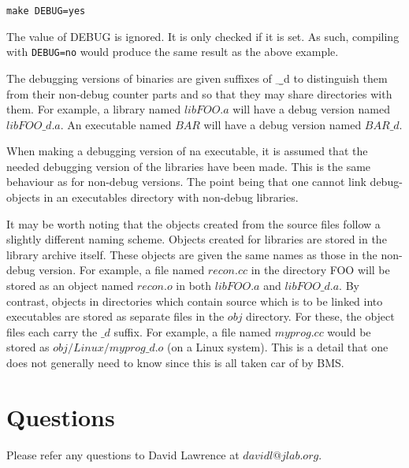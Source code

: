 \documentclass[12pt]{article}
\begin{document}
\begin{lstlisting}[frame=single,backgroundcolor=\color{cmdbkgd}]
make DEBUG=yes
\end{lstlisting}

The value of DEBUG is ignored. It is only checked if it is set. As
such, compiling with {\lstinline !DEBUG=no!} would produce the same
result as the above example.

The debugging versions of binaries are given suffixes of {\b \_d}
to distinguish them from their non-debug counter parts and so that
they may share directories with them. For example, a library named
$libFOO.a$ will have a debug version named $libFOO\_d.a$. An executable
named $BAR$ will have a debug version named $BAR\_d$.

When making a debugging version of na executable, it is assumed that
the needed debugging version of the libraries have been made.
This is the same behaviour as for non-debug versions. The point
being that one cannot link debug-objects in an executables
directory with non-debug libraries.

It may be worth noting that the objects created from the source 
files follow a slightly different naming scheme. Objects created
for libraries are stored in the library archive itself. These objects
are given the same names as those in the non-debug version. For
example, a file named $recon.cc$ in the directory FOO will be stored
as an object named $recon.o$ in both $libFOO.a$ and $libFOO\_d.a$.
By contrast, objects in directories which contain source which
is to be linked into executables are stored as separate files in
the $obj$ directory. For these, the object files each carry the 
$\_d$ suffix. For example, a file named $myprog.cc$ would be
stored as $obj/Linux/myprog\_d.o$ (on a Linux system). This is a
detail that one does not generally need to know since this is
all taken car of by BMS.


\section{Questions}
Please refer any questions to David Lawrence at $davidl@jlab.org$.
\end{document}

